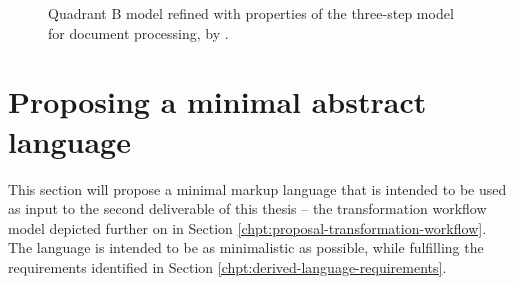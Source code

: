 \documentclass{scrreprt}
\begin{document}
\begin{figure}[h]
  \centering


  \caption{Quadrant B model refined with properties of the three-step model for document processing, by \citet{goldfarb}.}
  \label{fig:quad-b-with-three-step-process}
\end{figure}

































%
%
%
%
%
%


\chapter{Proposing a minimal abstract language}
\label{chpt:proposal-language}
This section will propose a minimal markup language that is intended to be used as input to the second deliverable of this thesis -- the transformation workflow model depicted further on in Section \ref{chpt:proposal-transformation-workflow}. The language is intended to be as minimalistic as possible, while fulfilling the requirements identified in Section \ref{chpt:derived-language-requirements}.
\end{document}
